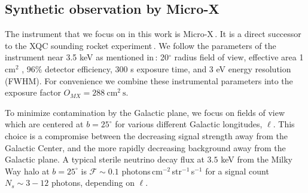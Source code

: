\documentclass[aps,prd,10pt,twocolumn,superscriptaddress,showpacs,footinbib]{revtex4-1}
\newcommand{\units}[1]{~\mathrm{#1}}
\begin{document}



\subsection{Synthetic observation by Micro-X}
\label{sec:microx}

The instrument that we focus on in this work is Micro-X\,\cite{Figueroa-Feliciano:2015gwa}.  It is a
direct successor to the XQC sounding rocket
experiment\,\cite{McCammon:2002gb,Boyarsky:2006hr,Crowder:2012ts}.  We follow the parameters of the
instrument near 3.5 keV as mentioned in\,\cite{Figueroa-Feliciano:2015gwa}: 20$^\circ$ radius field
of view, effective area 1 cm$^2$ , 96\% detector efficiency, 300 s exposure time, and 3 eV
energy resolution (FWHM). For convenience we combine these instrumental parameters into the exposure factor
$O_{MX}=288\units{cm^2~s}$.

To minimize contamination by the Galactic plane, we focus on fields of view which are centered at $b = 25^\circ$ for various different Galactic longitudes, $\ell$.  This choice is a compromise between the decreasing signal strength away from the Galactic Center, and the more rapidly decreasing background away from the Galactic plane.  A typical sterile neutrino decay flux at $3.5$ keV from
the Milky Way halo at $b=25^\circ$ is $\mathcal{F}\sim 0.1$ photons\,cm$^{-2}$\,str$^{-1}$\,s$^{-1}$ 
for a signal count $N_s \sim 3-12$ photons, depending on $\ell$. 
\end{document}
